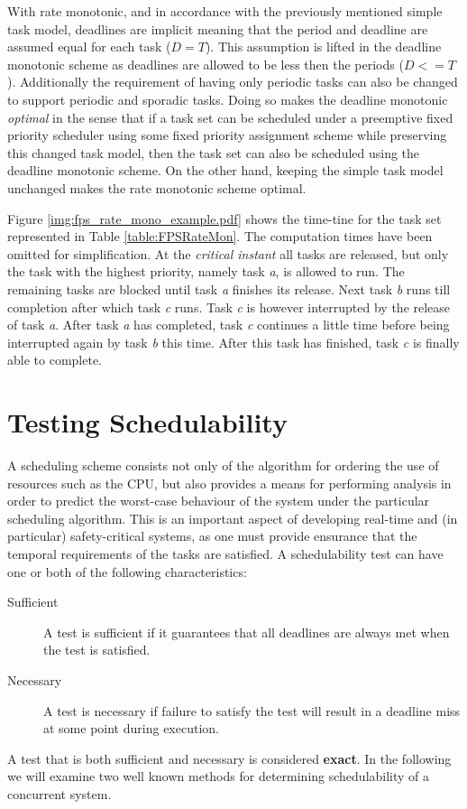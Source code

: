 With rate monotonic, and in accordance with the previously mentioned simple task model, deadlines are implicit meaning that the period and deadline are assumed equal for each task ($D = T$). This assumption is lifted in the deadline monotonic scheme as deadlines are allowed to be less then the periods ($D <= T$). Additionally the requirement of having only periodic tasks can also be changed to support periodic and sporadic tasks. Doing so makes the deadline monotonic \textit{optimal} in the sense that if a task set can be scheduled under a preemptive fixed priority scheduler using some fixed priority assignment scheme while preserving this changed task model, then the task set can also be scheduled using the deadline monotonic scheme. On the other hand, keeping the simple task model unchanged makes the rate monotonic scheme optimal.

Figure \ref{img:fps_rate_mono_example.pdf} shows the time-tine for the task set represented in Table \ref{table:FPSRateMon}. The computation times have been omitted for simplification. At the \textit{critical instant} all tasks are released, but only the task with the highest priority, namely task \textit{a}, is allowed to run. The remaining tasks are blocked until task \textit{a} finishes its release. Next task \textit{b} runs till completion after which task \textit{c} runs. Task \textit{c} is however interrupted by the release of task \textit{a}. After task \textit{a} has completed, task \textit{c} continues a little time before being interrupted again by task \textit{b} this time. After this task has finished, task \textit{c} is finally able to complete.



\section{Testing Schedulability} %
\label{sec:schedulability_analysis}
A scheduling scheme consists not only of the algorithm for ordering the use of resources such as the CPU, but also provides a means for performing analysis in order to predict the worst-case behaviour of the system under the particular scheduling algorithm. This is an important aspect of developing real-time and (in particular) safety-critical systems, as one must provide ensurance that the temporal requirements of the tasks are satisfied. A schedulability test can have one or both of the following characteristics:
\begin{description}
	\item[Sufficient] A test is sufficient if it guarantees that all deadlines are always met when the test is satisfied.
	\item[Necessary] A test is necessary if failure to satisfy the test will result in a deadline miss at some point during execution.
\end{description}
A test that is both sufficient and necessary is considered \textbf{exact}. In the following we will examine two well known methods for determining schedulability of a concurrent system.

